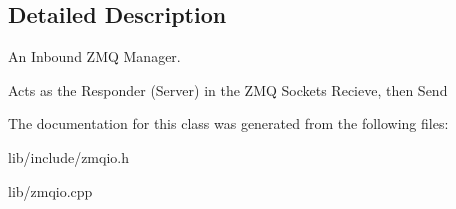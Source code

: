 \subsection{Detailed Description}
An Inbound Z\-M\-Q Manager. 

Acts as the Responder (Server) in the Z\-M\-Q Sockets Recieve, then Send 

The documentation for this class was generated from the following files\-:\begin{DoxyCompactItemize}
\item 
lib/include/zmqio.\-h\item 
lib/zmqio.\-cpp\end{DoxyCompactItemize}
